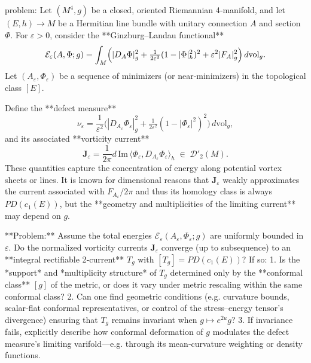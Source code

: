 problem:  
Let \((M^4,g)\) be a closed, oriented Riemannian 4‑manifold, and let \((E,h)\to M\) be a Hermitian line bundle with unitary connection \(A\) and section \(\Phi\).  
For \(\varepsilon>0\), consider the **Ginzburg–Landau functional**  
\[
\mathcal{E}_\varepsilon(A,\Phi;g) = \int_M
\Bigl(|D_A\Phi|_g^2 + \tfrac{1}{2\varepsilon^2}(1-|\Phi|_h^2)^2 + \varepsilon^2|F_A|_g^2\Bigr)\,d\mathrm{vol}_g.
\]
Let \((A_\varepsilon,\Phi_\varepsilon)\) be a sequence of minimizers (or near‑minimizers) in the topological class \([E]\).  

Define the **defect measure**  
\[
\nu_\varepsilon = \frac{1}{\varepsilon^2}\bigl(|D_{A_\varepsilon}\Phi_\varepsilon|_g^2 
+ \tfrac{1}{2\varepsilon^2}(1-|\Phi_\varepsilon|^2)^2\bigr)
\, d\mathrm{vol}_g,
\]
and its associated **vorticity current**
\[
\mathbf{J}_\varepsilon = \frac{1}{2\pi} d\, \mathrm{Im}\,\langle \Phi_\varepsilon, D_{A_\varepsilon}\Phi_\varepsilon \rangle_h
\;\in\; \mathcal{D}'_2(M).
\]
These quantities capture the concentration of energy along potential vortex sheets or lines.  
It is known for dimensional reasons that \(\mathbf{J}_\varepsilon\) weakly approximates the current associated with \(F_{A_\varepsilon}/2\pi\) and thus its homology class is always \(PD(c_1(E))\), but the **geometry and multiplicities of the limiting current** may depend on \(g\).

**Problem:**  
Assume the total energies \(\mathcal{E}_\varepsilon(A_\varepsilon,\Phi_\varepsilon;g)\) are uniformly bounded in \(\varepsilon\).  
Do the normalized vorticity currents \(\mathbf{J}_\varepsilon\) converge (up to subsequence) to an **integral rectifiable 2‑current** \(T_g\) with \([T_g]=PD(c_1(E))\)?  
If so:
1. Is the *support* and *multiplicity structure* of \(T_g\) determined only by the **conformal class** \([g]\) of the metric, or does it vary under metric rescaling within the same conformal class?  
2. Can one find geometric conditions (e.g. curvature bounds, scalar‑flat conformal representatives, or control of the stress–energy tensor’s divergence) ensuring that \(T_g\) remains invariant when \(g\mapsto e^{2u}g\)?  
3. If invariance fails, explicitly describe how conformal deformation of \(g\) modulates the defect measure’s limiting varifold—e.g. through its mean‑curvature weighting or density functions.

